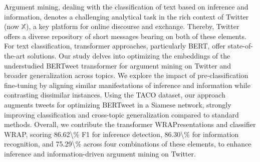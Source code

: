 Argument mining, dealing with the classification of text based on inference and information, denotes a challenging analytical task in the rich context of Twitter (now $\mathbb{X}$), a key platform for online discourse and exchange. Thereby, Twitter offers a diverse repository of short messages bearing on both of these elements. For text classification, transformer approaches, particularly BERT, offer state-of-the-art solutions. Our study delves into optimizing the embeddings of the understudied BERTweet transformer for argument mining on Twitter and broader generalization across topics. We explore the impact of pre-classification fine-tuning by aligning similar manifestations of inference and information while contrasting dissimilar instances. Using the TACO dataset, our approach augments tweets for optimizing BERTweet in a Siamese network, strongly improving classification and cross-topic generalization compared to standard methods. Overall, we contribute the transformer WRAPresentations and classifier WRAP, scoring 86.62\textbackslash{}\% F1 for inference detection, 86.30\textbackslash{}\% for information recognition, and 75.29\textbackslash{}\% across four combinations of these elements, to enhance inference and information-driven argument mining on Twitter.